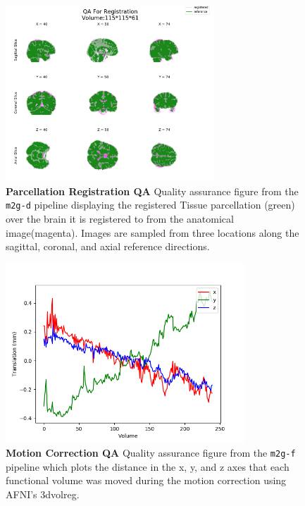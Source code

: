 \begin{figure}[h!]
    \centering
    \includegraphics[width = 0.7\textwidth]{figures/m2g/diff_mapped_atlas.png}
    \caption[Quality assurance figure from the \texttt{m2g-d} pipeline displaying the registered Tissue parcellation (green) over the brain it is registered to from the anatomical image(magenta).]{\textbf{Parcellation Registration QA} Quality assurance figure from the \texttt{m2g-d} pipeline displaying the registered Tissue parcellation (green) over the brain it is registered to from the anatomical image(magenta). Images are sampled from three locations along the sagittal, coronal, and axial reference directions.
    }
    \label{fig:diff_mapped}
\end{figure}

\begin{figure}[h!]
    \centering
    \includegraphics[width = 0.8\textwidth]{figures/m2g/func_motion_plot.png}
    \caption[ Quality assurance figure from the \texttt{m2g-f} pipeline which plots the distance in the x, y, and z axes that each functional volume was moved during the motion correction using AFNI's 3dvolreg.]{\textbf{Motion Correction QA} Quality assurance figure from the \texttt{m2g-f} pipeline which plots the distance in the x, y, and z axes that each functional volume was moved during the motion correction using AFNI's 3dvolreg.
    }
    \label{fig:func_motion}
\end{figure}
